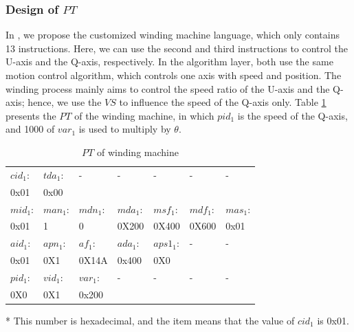 \documentclass[journal,UTF8]{IEEEtran}
\begin{document}
	\subsubsection{Design of $PT$}
	In \cite{wu2018customized}, we propose the customized winding machine language, which only contains 13 instructions. Here, we can use the second and third instructions to control the U-axis and the Q-axis, respectively. In the algorithm layer, both use the same motion control algorithm, which controls one axis with speed and position. The winding process mainly aims to control the speed ratio of the U-axis and the Q-axis; hence, we use the $VS$ to influence the speed of the Q-axis only. Table \ref{table:PTofWinding} presents the $PT$ of the winding machine, in which $pid_1$ is the speed of the Q-axis, and 1000 of $var_1$ is used to multiply by $\theta$.
	\begin{table}
		\scriptsize \caption{$PT$ of winding machine}
		\label{table:PTofWinding}
		\begin{threeparttable}
			\renewcommand{\arraystretch}{1.4}
			\setlength\tabcolsep{3pt}
			\begin{tabular}{|p{1cm}|p{1cm}|p{1cm}|p{1cm}|p{1cm}|p{1cm}|p{1cm}|}
				\hline
				$cid_1$: & $tda_1:$   &- &-& -  &- &- \\
				0x01\tnote{*}&0x00&& &&&\\
				\hline
				$mid_1$:   & $man_1$: &$mdn_1$: &$mda_1$:&$msf_1$:& $mdf_1$:  & $mas_1$:\\
				0x01      & 1     &   0    &0X200   &0X400   & 0X600  &0x01 \\
				\hline
				$aid_1$:  & $apn_1$:& $af_1$: &$ada_1$: &$aps1_1$:  &-&-\\
				0x01     & 0X1    & 0X14A  &0x400 &0X0   & &\\
				\hline
				$pid_1$:  &$vid_1$: &$var_1$: &-  &-  &- &-\\
				0X0      & 0X1    & 0x200   &         &   & &\\
		    	\hline
			\end{tabular}
			\begin{tablenotes}
				\footnotesize
				\item[*] This number is hexadecimal, and the item means that the value of $cid_1$ is 0x01.
			\end{tablenotes}
		\end{threeparttable}
	\end{table}
\end{document}
